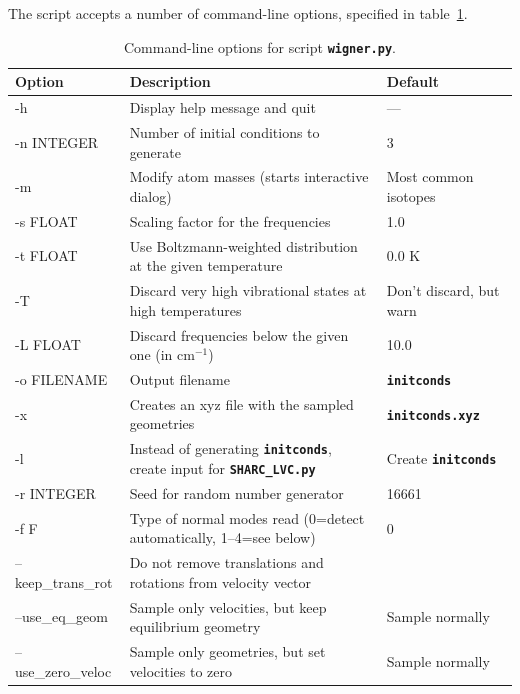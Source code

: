 \documentclass[a4paper,10pt,DIV=15,openany]{scrbook}
\newcommand{\ttt}[1]{\textbf{\texttt{#1}}}
\begin{document}
The script accepts a number of command-line options, specified in table~\ref{tab:wigner_opts}.
\begin{table}
  \centering
  \caption{Command-line options for script \ttt{wigner.py}.}
  \label{tab:wigner_opts}
  \begin{tabular}{>{\ttfamily}lp{9cm}l}
    \hline
    \rmfamily Option        &Description      &Default\\
    \hline
    -h                  &Display help message and quit              &---                            \\
    -n  INTEGER         &Number of initial conditions to generate   &3                              \\
    -m                  &Modify atom masses (starts interactive dialog)  &Most common isotopes      \\
    -s  FLOAT           &Scaling factor for the frequencies         &1.0                            \\
    -t  FLOAT           &Use Boltzmann-weighted distribution at the given temperature   &0.0 K\\
    -T                  &Discard very high vibrational states at high temperatures      &Don't discard, but warn\\
    -L  FLOAT           &Discard frequencies below the given one (in cm$^{-1}$)         &10.0\\
    -o  FILENAME        &Output filename                            &\ttt{initconds}                \\
    -x                  &Creates an xyz file with the sampled geometries &\ttt{initconds.xyz}       \\
    -l                  &Instead of generating \ttt{initconds}, create input for \ttt{SHARC\_LVC.py}    &Create \ttt{initconds}\\
    -r  INTEGER         &Seed for random number generator           &16661                          \\
    -f F                &Type of normal modes read (0=detect automatically, 1--4=see below)     &0\\
    --keep\_trans\_rot  &Do not remove translations and rotations from velocity vector &\\
    --use\_eq\_geom     &Sample only velocities, but keep equilibrium geometry  &Sample normally\\
    --use\_zero\_veloc  &Sample only geometries, but set velocities to zero     &Sample normally\\
    \hline
  \end{tabular}
\end{table}
\end{document}

